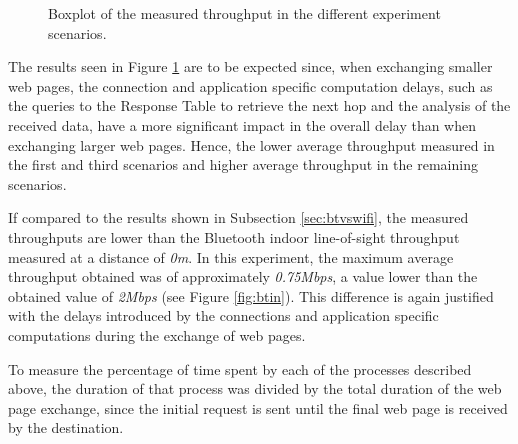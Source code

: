\begin{figure}[ht]
	\noindent{}
	\caption{\label{fig:boxplotthroughput} Boxplot of the measured throughput in the different experiment scenarios.}
\end{figure}

The results seen in Figure \ref{fig:boxplotthroughput} are to be expected since, when exchanging smaller web pages, the connection and application specific computation delays, such as the queries to the Response Table to retrieve the next hop and the analysis of the received data, have a more significant impact in the overall delay than when exchanging larger web pages. Hence, the lower average throughput measured in the first and third scenarios and higher average throughput in the remaining scenarios.

If compared to the results shown in Subsection \ref{sec:btvswifi}, the measured throughputs are lower than the Bluetooth indoor line-of-sight throughput measured at a distance of \textit{0m}. In this experiment, the maximum average throughput obtained was of approximately \textit{0.75Mbps}, a value lower than the obtained value of \textit{2Mbps} (see Figure \ref{fig:btin}). This difference is again justified with the delays introduced by the connections and application specific computations during the exchange of web pages.

To measure the percentage of time spent by each of the processes described above, the duration of that process was divided by the total duration of the web page exchange, since the initial request is sent until the final web page is received by the destination.

